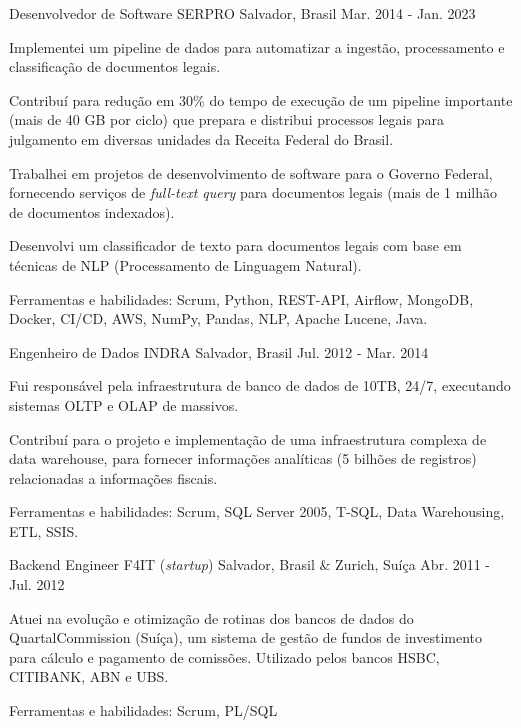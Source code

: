 \begin{cventries}
\cventry
{Desenvolvedor de Software} %
{SERPRO} %
{Salvador, Brasil} %
{Mar. 2014 - Jan. 2023} %
{ %
\begin{cvitems}
	\item{Implementei um pipeline de dados para automatizar a ingestão, processamento e classificação de documentos legais.}
	\item{Contribuí para redução em 30\% do tempo de execução de um pipeline importante (mais de 40 GB por ciclo) que prepara e distribui processos legais para julgamento em diversas unidades da Receita Federal do Brasil.}
	\item{Trabalhei em projetos de desenvolvimento de software para o Governo Federal, fornecendo serviços de \textit{full-text query} para documentos legais (mais de 1 milhão de documentos indexados).}
	\item{Desenvolvi um classificador de texto para documentos legais com base em técnicas de NLP (Processamento de Linguagem Natural).}
	\item{Ferramentas e habilidades: Scrum, Python, REST-API, Airflow, MongoDB, Docker, CI/CD, AWS, NumPy, Pandas, NLP, Apache Lucene, Java.}
\end{cvitems}
}


\cventry
{Engenheiro de Dados} %
{INDRA} %
{Salvador, Brasil} %
{Jul. 2012 - Mar. 2014} %
{ %
\begin{cvitems}
	\item{Fui responsável pela infraestrutura de banco de dados de 10TB, 24/7, executando sistemas OLTP e OLAP de massivos.}
	\item{Contribuí para o projeto e implementação de uma infraestrutura complexa de data warehouse, para fornecer informações analíticas (5 bilhões de registros) relacionadas a informações fiscais.}
	\item{Ferramentas e habilidades: Scrum, SQL Server 2005, T-SQL, Data Warehousing, ETL, SSIS.}
\end{cvitems} 
}


\cventry
{Backend Engineer} %
{F4IT (\textit{startup})} %
{Salvador, Brasil \& Zurich, Suíça} %
{Abr. 2011 - Jul. 2012} %
{ %
\begin{cvitems}
	\item{Atuei na evolução e otimização de rotinas dos bancos de dados do QuartalCommission (Suíça), um sistema de gestão de fundos de investimento para cálculo e pagamento de comissões. Utilizado pelos bancos HSBC, CITIBANK, ABN e UBS.}
	\item{Ferramentas e habilidades: Scrum, PL/SQL}
\end{cvitems}
}


\end{cventries}
